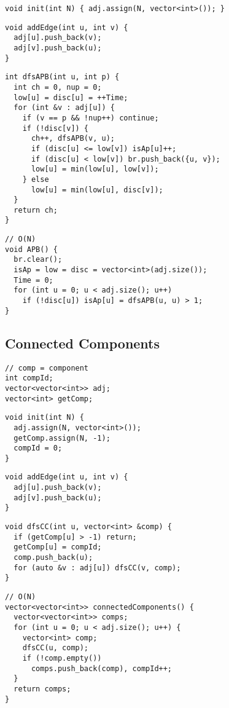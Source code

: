 \documentclass[twoside]{article}
\newcommand{\fileTitleStyle}{\large\underline}
\begin{document}
\begin{multicols*}{2}
\begin{verbatim}
void init(int N) { adj.assign(N, vector<int>()); }
\end{verbatim}
\vspace{-12pt}
\begin{verbatim}
void addEdge(int u, int v) {
  adj[u].push_back(v);
  adj[v].push_back(u);
}
\end{verbatim}
\vspace{-12pt}
\begin{verbatim}
int dfsAPB(int u, int p) {
  int ch = 0, nup = 0;
  low[u] = disc[u] = ++Time;
  for (int &v : adj[u]) {
    if (v == p && !nup++) continue;
    if (!disc[v]) {
      ch++, dfsAPB(v, u);
      if (disc[u] <= low[v]) isAp[u]++;
      if (disc[u] < low[v]) br.push_back({u, v});
      low[u] = min(low[u], low[v]);
    } else
      low[u] = min(low[u], disc[v]);
  }
  return ch;
}
\end{verbatim}
\vspace{-12pt}
\begin{verbatim}
// O(N)
void APB() {
  br.clear();
  isAp = low = disc = vector<int>(adj.size());
  Time = 0;
  for (int u = 0; u < adj.size(); u++)
    if (!disc[u]) isAp[u] = dfsAPB(u, u) > 1;
}
\end{verbatim}

\subsectionfont{\centering\bfseries\LARGE}
\subsectionfont{\fileTitleStyle}
\subsection*{Connected Components}
\begin{verbatim}
// comp = component
int compId;
vector<vector<int>> adj;
vector<int> getComp;
\end{verbatim}
\vspace{-12pt}
\begin{verbatim}
void init(int N) {
  adj.assign(N, vector<int>());
  getComp.assign(N, -1);
  compId = 0;
}
\end{verbatim}
\vspace{-12pt}
\begin{verbatim}
void addEdge(int u, int v) {
  adj[u].push_back(v);
  adj[v].push_back(u);
}
\end{verbatim}
\vspace{-12pt}
\begin{verbatim}
void dfsCC(int u, vector<int> &comp) {
  if (getComp[u] > -1) return;
  getComp[u] = compId;
  comp.push_back(u);
  for (auto &v : adj[u]) dfsCC(v, comp);
}
\end{verbatim}
\vspace{-12pt}
\begin{verbatim}
// O(N)
vector<vector<int>> connectedComponents() {
  vector<vector<int>> comps;
  for (int u = 0; u < adj.size(); u++) {
    vector<int> comp;
    dfsCC(u, comp);
    if (!comp.empty())
      comps.push_back(comp), compId++;
  }
  return comps;
}
\end{verbatim}


\end{multicols*}
\end{document}
